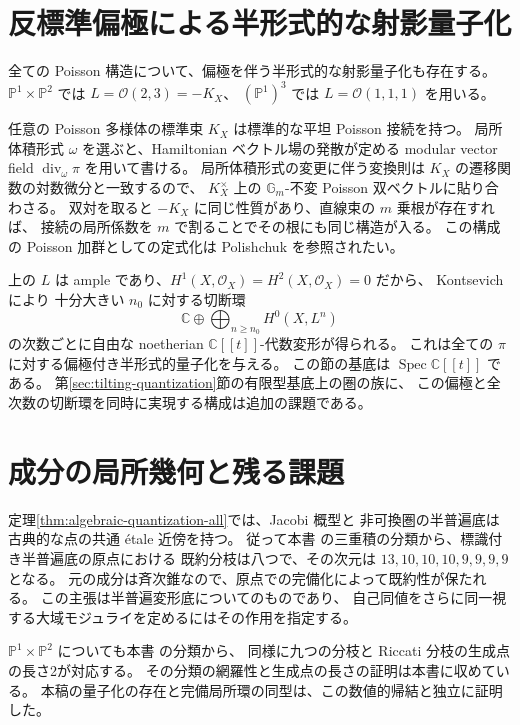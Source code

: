 \documentclass[11pt,a4paper]{ltjsarticle}
\theoremstyle{definition}
\newcommand{\PP}{\mathbb P}
\newcommand{\CC}{\mathbb C}
\begin{document}
\section{反標準偏極による半形式的な射影量子化}
\label{sec:anticanonical-quantization}

全ての Poisson 構造について、偏極を伴う半形式的な射影量子化も存在する。
$\PP^1\times\PP^2$ では $L=\mathcal O(2,3)=-K_X$、
$(\PP^1)^3$ では $L=\mathcal O(1,1,1)$ を用いる。

任意の Poisson 多様体の標準束 $K_X$ は標準的な平坦 Poisson 接続を持つ。
局所体積形式 $\omega$ を選ぶと、Hamiltonian ベクトル場の発散が定める
modular vector field $\operatorname{div}_{\omega}\pi$ を用いて書ける。
局所体積形式の変更に伴う変換則は $K_X$ の遷移関数の対数微分と一致するので、
$K_X^{\times}$ 上の $\mathbb G_m$-不変 Poisson 双ベクトルに貼り合わさる。
双対を取ると $-K_X$ に同じ性質があり、直線束の $m$ 乗根が存在すれば、
接続の局所係数を $m$ で割ることでその根にも同じ構造が入る。
この構成の Poisson 加群としての定式化は
Polishchuk \cite[\S1]{PolishchukQuant} を参照されたい。

上の $L$ は ample であり、$H^1(X,\mathcal O_X)=H^2(X,\mathcal O_X)=0$ だから、
Kontsevich \cite[\S3.1、構成2]{KontsevichAlgebraic} により
十分大きい $n_0$ に対する切断環
\[
 \CC\oplus\bigoplus_{n\geq n_0}H^0(X,L^n)
\]
の次数ごとに自由な noetherian $\CC[[t]]$-代数変形が得られる。
これは全ての $\pi$ に対する偏極付き半形式的量子化を与える。
この節の基底は $\operatorname{Spec}\CC[[t]]$ である。
第\ref{sec:tilting-quantization}節の有限型基底上の圏の族に、
この偏極と全次数の切断環を同時に実現する構成は追加の課題である。

\section{成分の局所幾何と残る課題}

定理\ref{thm:algebraic-quantization-all}では、Jacobi 概型と
非可換圏の半普遍底は古典的な点の共通 \'etale 近傍を持つ。
従って本書 の三重積の分類から、標識付き半普遍底の原点における
既約分枝は八つで、その次元は $13,10,10,10,9,9,9,9$ となる。
元の成分は斉次錐なので、原点での完備化によって既約性が保たれる。
この主張は半普遍変形底についてのものであり、
自己同値をさらに同一視する大域モジュライを定めるにはその作用を指定する。

$\PP^1\times\PP^2$ についても本書 の分類から、
同様に九つの分枝と Riccati 分枝の生成点の長さ2が対応する。
その分類の網羅性と生成点の長さの証明は本書に収めている。
本稿の量子化の存在と完備局所環の同型は、この数値的帰結と独立に証明した。
\end{document}
